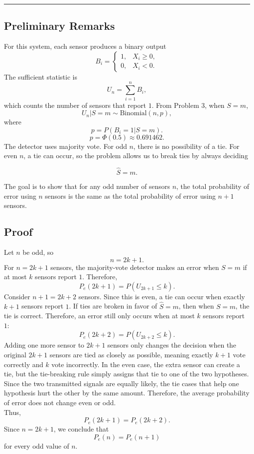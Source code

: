 \documentclass[12pt,a4paper]{article}
\begin{document}
\hrule

\subsection{Preliminary Remarks}
For this system, each sensor produces a binary output
\[
B_i=
\begin{cases}
1, & X_i\geq 0,\\
0, & X_i<0.
\end{cases}
\]
The sufficient statistic is
\[
U_n=\sum_{i=1}^{n}B_i,
\]
which counts the number of sensors that report \(1\). From Problem 3, when \(S=m\),
\[
U_n|S=m \sim \text{Binomial}(n,p),
\]
where
\[
p=P(B_i=1|S=m).
\]
\[
p=\Phi(0.5)\approx 0.691462.
\]
The detector uses majority vote. For odd \(n\), there is no possibility of a tie. For even \(n\), a tie can occur, so the problem allows us to break ties by always deciding

\[
\hat{S}=m.
\]

The goal is to show that for any odd number of sensors \(n\), the total probability of error using \(n\) sensors is the same as the total probability of error using \(n+1\) sensors.

\subsection{Proof}

Let \(n\) be odd, so
\[
n=2k+1.
\]
For \(n=2k+1\) sensors, the majority-vote detector makes an error when \(S=m\) if at most \(k\) sensors report \(1\). Therefore,
\[
P_e(2k+1)
=
P(U_{2k+1}\leq k).
\]
Consider \(n+1=2k+2\) sensors. Since this is even, a tie can occur when exactly \(k+1\) sensors report \(1\). If ties are broken in favor of \(\hat{S}=m\), then when \(S=m\), the tie is correct. Therefore, an error still only occurs when at most \(k\) sensors report \(1\):
\[
P_e(2k+2)
=
P(U_{2k+2}\leq k).
\]
Adding one more sensor to \(2k+1\) sensors only changes the decision when the original \(2k+1\) sensors are tied as closely as possible, meaning exactly \(k+1\) vote correctly and \(k\) vote incorrectly. In the even case, the extra sensor can create a tie, but the tie-breaking rule simply assigns that tie to one of the two hypotheses. Since the two transmitted signals are equally likely, the tie cases that help one hypothesis hurt the other by the same amount. Therefore, the average probability of error does not change even or odd.\\

Thus,
\[
P_e(2k+1)=P_e(2k+2).
\]
Since \(n=2k+1\), we conclude that
\[
\boxed{P_e(n)=P_e(n+1)}
\]
for every odd value of \(n\).
\end{document}
